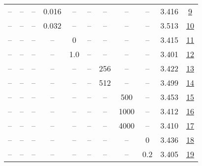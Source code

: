 \begin{table}[H]
\begin{tabular}{ccccccccccc}
-- & -- & -- & 0.016 & -- & -- & -- & -- & -- & 3.416 & \href{https://wandb.ai/stanford-mercury/optimizer-scaling/runs/sweep-130m-5B-cautious0d244clr0.016-wd0.1-minlr0-warmup2000-b10.-f8a9e5}{9} \\
-- & -- & -- & 0.032 & -- & -- & -- & -- & -- & 3.513 & \href{https://wandb.ai/stanford-mercury/optimizer-scaling/runs/sweep-130m-5B-cautious6d71bblr0.032-wd0.1-minlr0-warmup2000-b10.-0b7d6f}{10} \\
-- & -- & -- & -- & 0 & -- & -- & -- & -- & 3.415 & \href{https://wandb.ai/stanford-mercury/optimizer-scaling/runs/sweep-130m-5B-cautiousec447blr0.008-wd0.1-minlr0-warmup2000-b10.-2c67f7}{11} \\
-- & -- & -- & -- & 1.0 & -- & -- & -- & -- & 3.401 & \href{https://wandb.ai/stanford-mercury/optimizer-scaling/runs/sweep-130m-5B-cautious97beaelr0.008-wd0.1-minlr0-warmup2000-b10.-2f8b4f}{12} \\
-- & -- & -- & -- & -- & -- & 256 & -- & -- & 3.422 & \href{https://wandb.ai/stanford-mercury/optimizer-scaling/runs/sweep-130m-5B-cautious8d0e3elr0.008-wd0.1-minlr0-warmup2000-b10.-b27473}{13} \\
-- & -- & -- & -- & -- & -- & 512 & -- & -- & 3.499 & \href{https://wandb.ai/stanford-mercury/optimizer-scaling/runs/sweep-130m-5B-cautious57715elr0.008-wd0.1-minlr0-warmup2000-b10.-9560c1}{14} \\
-- & -- & -- & -- & -- & -- & -- & 500 & -- & 3.453 & \href{https://wandb.ai/stanford-mercury/optimizer-scaling/runs/sweep-130m-5B-cautious7e65d1lr0.008-wd0.1-minlr0-warmup500-b10.9-7f852d}{15} \\
-- & -- & -- & -- & -- & -- & -- & 1000 & -- & 3.412 & \href{https://wandb.ai/stanford-mercury/optimizer-scaling/runs/sweep-130m-5B-cautiousc240falr0.008-wd0.1-minlr0-warmup1000-b10.-084dd4}{16} \\
-- & -- & -- & -- & -- & -- & -- & 4000 & -- & 3.410 & \href{https://wandb.ai/stanford-mercury/optimizer-scaling/runs/sweep-130m-5B-cautiousefff30lr0.008-wd0.1-minlr0-warmup4000-b10.-7b0fa2}{17} \\
-- & -- & -- & -- & -- & -- & -- & -- & 0 & 3.436 & \href{https://wandb.ai/stanford-mercury/optimizer-scaling/runs/sweep-130m-5B-cautiousa712calr0.008-wd0-minlr0-warmup2000-b10.98-789beb}{18} \\
-- & -- & -- & -- & -- & -- & -- & -- & 0.2 & 3.405 & \href{https://wandb.ai/stanford-mercury/optimizer-scaling/runs/sweep-130m-5B-cautious1bc634lr0.008-wd0.2-minlr0-warmup2000-b10.-9ef4b3}{19} \\
\bottomrule
\end{tabular}
\end{table}

